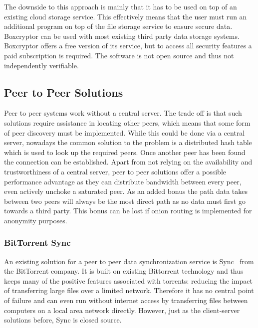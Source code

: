 The downside to this approach is mainly that it has to be used on top of an existing cloud storage service.
This effectively means that the user must run an additional program on top of the file storage service to ensure secure data.
Boxcryptor can be used with most existing third party data storage systems.
Boxcryptor offers a free version of its service, but to access all security features a paid subscription is required.
The software is not open source and thus not independently verifiable.

\subsection{Peer to Peer Solutions}
\label{sub:Peer to Peer Solutions}

Peer to peer systems work without a central server.
The trade off is that such solutions require assistance in locating other peers, which means that some form of peer discovery must be implemented.
While this could be done via a central server, nowadays the common solution to the problem is a distributed hash table~\cite{ratnasamy2001scalable} which is used to look up the required peers.
Once another peer has been found the connection can be established.
Apart from not relying on the availability and trustworthiness of a central server, peer to peer solutions offer a possible performance advantage as they can distribute bandwidth between every peer, even actively unchoke a saturated peer.
As an added bonus the path data takes between two peers will always be the most direct path as no data must first go towards a third party.
This bonus can be lost if onion routing is implemented for anonymity purposes.

\subsubsection{BitTorrent Sync}
\label{subs:BitTorrent Sync}

An existing solution for a peer to peer data synchronization service is Sync~\cite{web:site:bittorrent_sync} from the BitTorrent company.
It is built on existing Bittorrent technology and thus keeps many of the positive features associated with torrents: reducing the impact of transferring large files over a limited network.
Therefore it has no central point of failure and can even run without internet access by transferring files between computers on a local area network directly.
However, just as the client-server solutions before, Sync is closed source.

